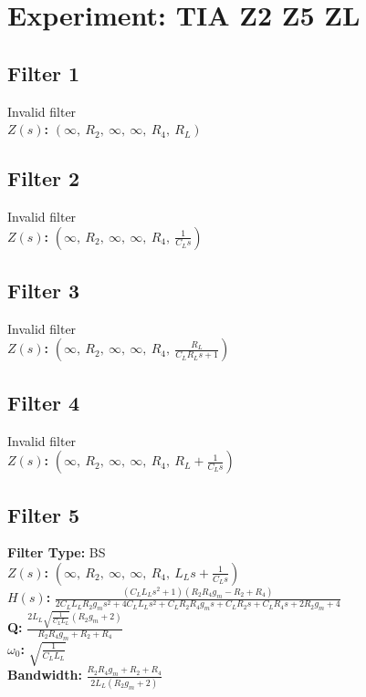 \documentclass{article}
\begin{document}
        \section*{Experiment: TIA Z2 Z5 ZL}
\subsection*{Filter 1}
Invalid filter \\ 
\textbf{$Z(s)$:} $\left( \infty, \  R_{2}, \  \infty, \  \infty, \  R_{4}, \  R_{L}\right)$ \\ 
\subsection*{Filter 2}
Invalid filter \\ 
\textbf{$Z(s)$:} $\left( \infty, \  R_{2}, \  \infty, \  \infty, \  R_{4}, \  \frac{1}{C_{L} s}\right)$ \\ 
\subsection*{Filter 3}
Invalid filter \\ 
\textbf{$Z(s)$:} $\left( \infty, \  R_{2}, \  \infty, \  \infty, \  R_{4}, \  \frac{R_{L}}{C_{L} R_{L} s + 1}\right)$ \\ 
\subsection*{Filter 4}
Invalid filter \\ 
\textbf{$Z(s)$:} $\left( \infty, \  R_{2}, \  \infty, \  \infty, \  R_{4}, \  R_{L} + \frac{1}{C_{L} s}\right)$ \\ 
\subsection*{Filter 5}
\textbf{Filter Type:} BS \\ 
\textbf{$Z(s)$:} $\left( \infty, \  R_{2}, \  \infty, \  \infty, \  R_{4}, \  L_{L} s + \frac{1}{C_{L} s}\right)$ \\ 
\textbf{$H(s)$:} $\frac{\left(C_{L} L_{L} s^{2} + 1\right) \left(R_{2} R_{4} g_{m} - R_{2} + R_{4}\right)}{2 C_{L} L_{L} R_{2} g_{m} s^{2} + 4 C_{L} L_{L} s^{2} + C_{L} R_{2} R_{4} g_{m} s + C_{L} R_{2} s + C_{L} R_{4} s + 2 R_{2} g_{m} + 4}$ \\ 
\textbf{Q:} $\frac{2 L_{L} \sqrt{\frac{1}{C_{L} L_{L}}} \left(R_{2} g_{m} + 2\right)}{R_{2} R_{4} g_{m} + R_{2} + R_{4}}$ \\ 
\textbf{$\omega_0$:} $\sqrt{\frac{1}{C_{L} L_{L}}}$ \\ 
\textbf{Bandwidth:} $\frac{R_{2} R_{4} g_{m} + R_{2} + R_{4}}{2 L_{L} \left(R_{2} g_{m} + 2\right)}$ \\ 
\end{document}
